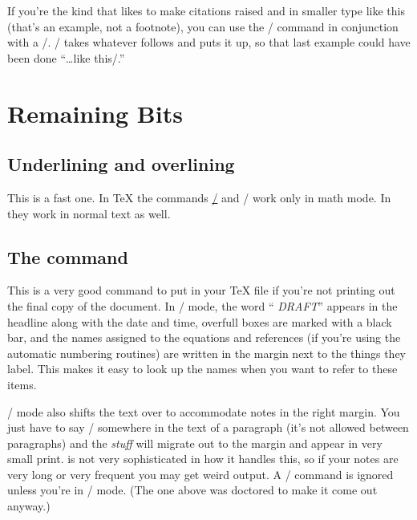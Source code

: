 \begin{(|it
name|/)}
\begin{(|it
name|/)}
\begin{narrow}[.80in]
\begin{narrow}
\begin{eqnseries}
If you're the kind that likes to make citations raised and in smaller type like
this\markup{[1]} (that's an example, not a footnote), you can use the
\tts\markup/ command in conjunction with a \tts\putref/.  \tts\markup/ takes
whatever follows and puts it up, so that last example could have been done
``\dots\tts like this/.''


{\bigfonts\bfs\section{Remaining Bits}}

{\sl\subsection{Underlining and overlining}}

This is a fast one.  In \TeX{} the commands \tts\underline/ and \tts\overline/
work only in math mode.  In \jyTeX{} they work in normal text as well.

{\sl\subsection{The\/ {\tt\string\draft} command}}

This is a very good command to put in your \TeX{} file if you're not printing
out the final copy of the document.  In \tts\draft/ mode, the word ``{\sl
DRAFT\/}'' appears in the headline along with the date and time, overfull boxes
are marked with a black bar, and the names assigned to the equations and
references (if you're using the automatic numbering routines) are written in
the margin next to the things they label.  This makes it easy to look up the
names when you want to refer to these items.

\tts\draft/ mode also shifts the text over to accommodate notes in the right
margin.  You just have to say
\tts{}/ somewhere in the text of a paragraph (it's not
allowed between paragraphs) and the {\it stuff\/} will migrate out to the
margin and appear in very small print. \jyTeX{} is not very sophisticated in
how it handles this, so if your notes are very long or very frequent you may
get weird output.  A \tts\marginnote/ command is ignored unless you're in
\tts\draft/ mode.  (The one above was doctored to make it come out anyway.)


\end{eqnseries}
\end{narrow}
\end{narrow}
\end{(|it
name|/)}
\end{(|it
name|/)}
